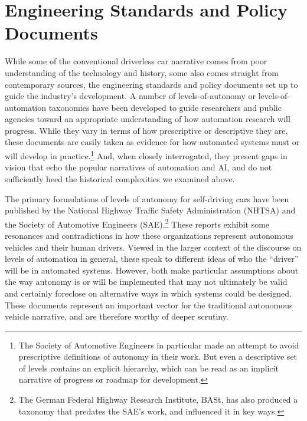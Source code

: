 \section{Engineering Standards and Policy Documents}



While some of the conventional driverless car narrative comes from
poor understanding of the technology and history, some also comes
straight from contemporary sources, the engineering standards and
policy documents set up to
guide the industry's development. A number of levels-of-autonomy or
levels-of-automation taxonomies have been developed to guide
researchers and public agencies toward an appropriate understanding of
how automation research will progress. While they vary in terms of how
prescriptive or descriptive they are, these documents are easily taken
as evidence for how automated systems must or will develop in
practice.\footnote{The Society of Automotive Engineers in particular
  made an attempt to avoid prescriptive definitions of autonomy in
  their work. But even a descriptive set of levels contains an
  explicit hierarchy, which can be read as an implicit narrative of
  progress or roadmap for development.} And, when closely
interrogated, they present gaps in vision that echo the popular
narratives of automation and AI, and do not sufficiently heed the
historical complexities we examined above.

The primary formulations of levels of autonomy for self-driving cars
have been published by the National Highway Traffic Safety
Administration (NHTSA) and the Society of Automotive Engineers
(SAE).\footnote{The German Federal Highway Research Institute, BASt,
 has also produced a taxonomy that predates the SAE's work, and
 influenced it in key ways.}
These reports exhibit some resonances and contradictions in how these
organizations represent autonomous vehicles and their human drivers.
Viewed in the larger context of the discourse on levels of automation
in general, these speak to different ideas of who the ``driver'' will be
in automated systems. However, both make particular assumptions about
the way autonomy is or will be implemented that may not ultimately be
valid and certainly foreclose on alternative ways in
which systems could be designed. These documents represent an important
vector for the traditional autonomous vehicle narrative, and are
therefore worthy of deeper scrutiny.


